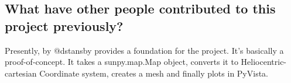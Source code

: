 \subsection{What have other people contributed to this project previously?}
    Presently, \pr by @dstansby provides a foundation for the project. It's basically a proof-of-concept.
    It takes a sunpy.map.Map object, converts it to Heliocentric-cartesian Coordinate system, creates a mesh and finally plots in PyVista.
    
